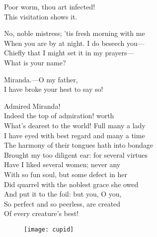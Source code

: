 \begin{verse_speech}[Prospero] 
Poor worm, thou art infected!\\
This visitation shows it.
\end{verse_speech}


\begin{verse_speech}[Ferdinand] 
No, noble mistress; 'tis fresh morning with me\\
When you are by at night. I do beseech you—\\
Chiefly that I might set it in my prayers—\\
What is your name?
\end{verse_speech}

\begin{verse_speech}[Miranda] 
Miranda.—O my father,\\
I have broke your hest to say so!
\end{verse_speech}

\begin{verse_speech}[Ferdinand] 
Admired Miranda!\\
Indeed the top of admiration! worth\\
What's dearest to the world! Full many a lady\\
I have eyed with best regard and many a time\\
The harmony of their tongues hath into bondage\\
Brought my too diligent ear: for several virtues\\
Have I liked several women; never any\\
With so fun soul, but some defect in her\\
Did quarrel with the noblest grace she owed\\
And put it to the foil: but you, O you,\\
So perfect and so peerless, are created\\
Of every creature's best!
\end{verse_speech}

\begin{figure}[tb]
\centering
\texttt{[image: cupid]}
\end{figure}

